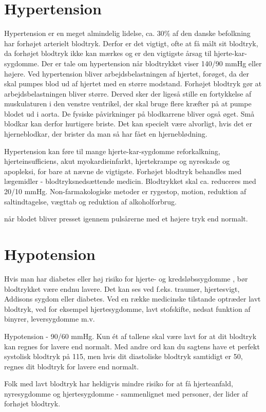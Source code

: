 \section{Hypertension} 
Hypertension er en meget almindelig lidelse, ca. 30\% af den danske befolkning har forhøjet arterielt blodtryk. Derfor er det vigtigt, ofte at få målt sit blodtryk, da forhøjet blodtryk ikke kan mærkes og er den vigtigste årsag til hjerte-kar-sygdomme. 
Der er tale om hypertension når blodtrykket viser 140/90 mmHg eller højere.
Ved hypertension bliver arbejdsbelastningen af hjertet, forøget, da der skal pumpes blod ud af hjertet med en større modstand. 
Forhøjet blodtryk gør at arbejdsbelastningen bliver større. Derved sker der ligeså stille en fortykkelse af muskulaturen i den venstre ventrikel, der skal bruge flere kræfter på at pumpe blodet ud i aorta. 
De fysiske påvirkninger på blodkarrene bliver også øget. Små blodkar kan derfor hurtigere briste. Det kan specielt være alvorligt, hvis det er hjerneblodkar, der brister da man så har fået en hjerneblødning. 


Hypertension kan føre til mange hjerte-kar-sygdomme
reforkalkning, hjerteinsufficiens, akut myokardieinfarkt, hjertekrampe og nyreskade og apopleksi, for bare at nævne de vigtigste. 
Forhøjet blodtryk behandles med lægemidler - blodtryksnedsættende medicin. Blodtrykket skal ca. reduceres med 20/10 mmHg. Non-farmakologiske metoder er rygestop, motion, reduktion af saltindtagelse, vægttab og reduktion af alkoholforbrug. 

når blodet bliver presset igennem pulsårerne med et højere tryk end normalt.

\section{Hypotension} 
 Hvis man har diabetes eller høj risiko for hjerte- og kredsløbssygdomme , bør blodtrykket være endnu lavere. Det kan ses ved f.eks. traumer, hjertesvigt, Addisons sygdom  eller diabetes.
Ved en række medicinske tilstande optræder lavt blodtryk, ved for eksempel hjertesygdomme, lavt stofskifte, nedsat funktion af binyrer, leversygdomme m.v.
 
Hypotension - 90/60 mmHg. Kun ét af tallene skal være lavt for at dit blodtryk kan regnes for lavere end normalt. Med andre ord kan du sagtens have et perfekt systolisk blodtryk på 115, men hvis dit diastoliske blodtryk samtidigt er 50, regnes dit blodtryk for lavere end normalt.

Folk med lavt blodtryk har heldigvis mindre risiko for at få hjerteanfald, nyresygdomme og hjertesygdomme - sammenlignet med personer, der lider af forhøjet blodtryk.

